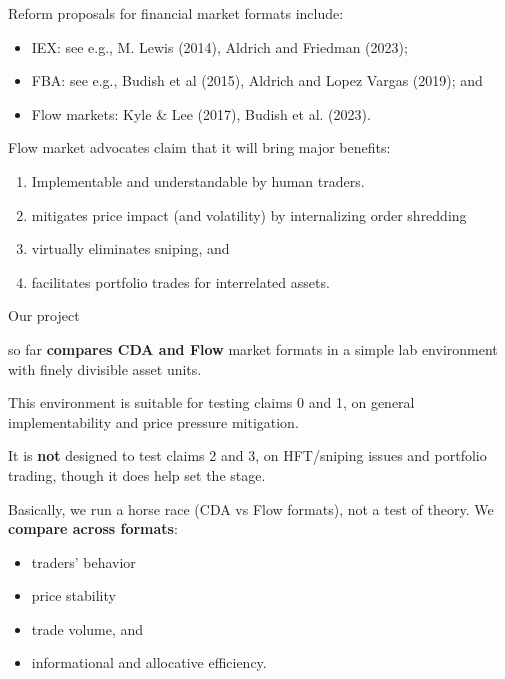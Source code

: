 \documentclass[10pt]{beamer}
\begin{document}
\begin{frame}{Reform proposals}
for financial market formats include:
    \begin{itemize}
\item IEX: see e.g., M. Lewis (2014), Aldrich and Friedman (2023); \pause
\item FBA: see e.g., Budish et al (2015), Aldrich and Lopez Vargas (2019); and \pause
\item Flow markets:  Kyle \& Lee (2017), Budish et al. (2023).
\end{itemize}
\end{frame}

\begin{frame}{Flow market advocates claim}
that it will bring major benefits:
\begin{enumerate}
\item[0.] Implementable and understandable by human traders.
\item mitigates price impact 
(and volatility) by internalizing order shredding \pause
\item virtually eliminates sniping, and \pause
\item facilitates portfolio trades for interrelated assets.
\end{enumerate}
\end{frame}



\begin{frame}{Our project}

so far \textbf{compares CDA and Flow} market formats in a simple lab environment  with finely divisible asset units. 
\pause

This environment is 
suitable for testing claims 0 and 1, on general implementability and price pressure mitigation. 
\pause

It is \textbf{not} designed to test claims 2 and 3, on HFT/sniping issues and portfolio trading, though it does help set the stage.
\pause 

Basically, we run a horse race (CDA vs Flow formats), not a test of theory.
We \textbf{compare across formats}:
\begin{itemize}
\item traders' behavior \pause
\item price stability \pause
\item trade volume, and \pause
\item informational and allocative efficiency. 
\end{itemize} 


\end{frame}
\end{document}
